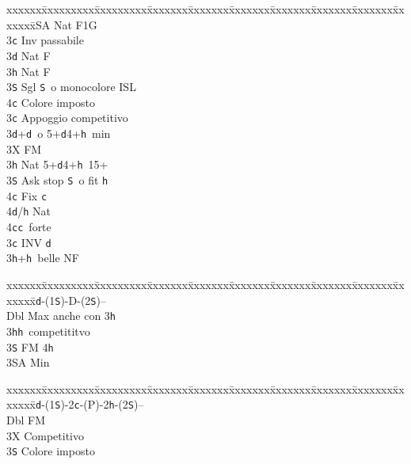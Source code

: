 \documentclass[a4paper,italian]{article}
\newcommand{\BS}{\small{\texttt{S}}}
\newcommand{\BC}{\small{\texttt{c}}}
\newcommand{\BD}{\small{\texttt{d}}}
\newcommand{\BH}{\small{\texttt{h}}}
\newenvironment{bidtable}
{\begin{tabbing}

    xxxxxx\=xxxxxxxxx\=xxxxxxxxx\=xxxxxxx\=xxxxxxx\=xxxxxxx\=xxxxxxx\=xxxxxxx\=xxxxxxx\=xxxxxxx\=\kill}
{\end{tabbing} }%
\newenvironment{sviluppi}
{\begin{tcolorbox}[colframe=azzurro,title=Sviluppi particolari]}
    {
\end{tcolorbox} }%
\begin{document}
\begin{multicols*}{2}
\begin{bidtable}
        2\small{SA} \> Nat F1G\+\\
        3\BC \> Inv passabile\\
        3\BD \> Nat F\\
        3\BH \> Nat F\\
        3\BS \> Sgl \BS\ o monocolore ISL\\
        4\BC \> Colore imposto\-\\
        3\BC \> Appoggio competitivo\\
        3\BD {}+\BD\ o 5+\BD 4+\BH\ min\+\\
        3X \> FM\-\\
        3\BH \> Nat 5+\BD 4+\BH\ 15+\+\\
        3\BS \> Ask stop \BS\ o fit \BH \\
        4\BC \> Fix \BC \\
        4\BD/\BH \> Nat\-\\
        4\BC {}\BC\ forte\-\\
        3\BC \> INV \BD \\
        3\BH {}+\BH\ belle NF\-
    \end{bidtable}

    \begin{sviluppi}
        \begin{bidtable}
            1\BD-(1\BS)-D-(2\BS)--\+\\
            Dbl \> Max anche con 3\BH \\
            3\BH {}\BH\ competititvo\\
            3\BS \> FM 4\BH \+\\
            3\small{SA} \> Min\-\-
        \end{bidtable}
        \bigbreak
        \begin{bidtable}
            1\BD-(1\BS)-2\BC-(P)-2\BH-(2\BS)--\+\\
            Dbl \> FM\\
            3X \> Competitivo\\
            3\BS \> Colore imposto\-
        \end{bidtable}
    \end{sviluppi}
\end{multicols*}
\end{document}
